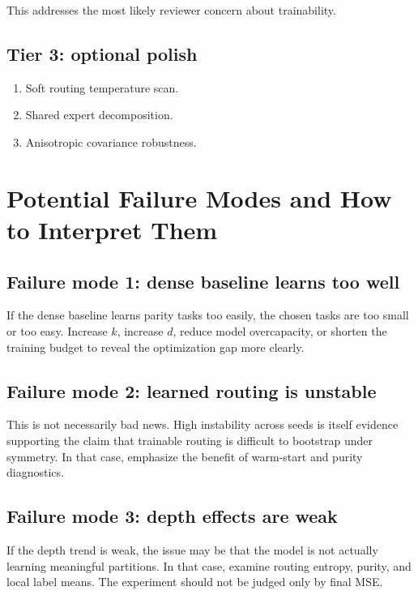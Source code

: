 \documentclass[11pt]{article}
\begin{document}
This addresses the most likely reviewer concern about trainability.

\subsection{Tier 3: optional polish}

\begin{enumerate}[leftmargin=2em]
    \item Soft routing temperature scan.
    \item Shared expert decomposition.
    \item Anisotropic covariance robustness.
\end{enumerate}

\section{Potential Failure Modes and How to Interpret Them}

\subsection{Failure mode 1: dense baseline learns too well}

If the dense baseline learns parity tasks too easily, the chosen tasks are too small or too easy. Increase $k$, increase $d$, reduce model overcapacity, or shorten the training budget to reveal the optimization gap more clearly.

\subsection{Failure mode 2: learned routing is unstable}

This is not necessarily bad news. High instability across seeds is itself evidence supporting the claim that trainable routing is difficult to bootstrap under symmetry. In that case, emphasize the benefit of warm-start and purity diagnostics.

\subsection{Failure mode 3: depth effects are weak}

If the depth trend is weak, the issue may be that the model is not actually learning meaningful partitions. In that case, examine routing entropy, purity, and local label means. The experiment should not be judged only by final MSE.
\end{document}
